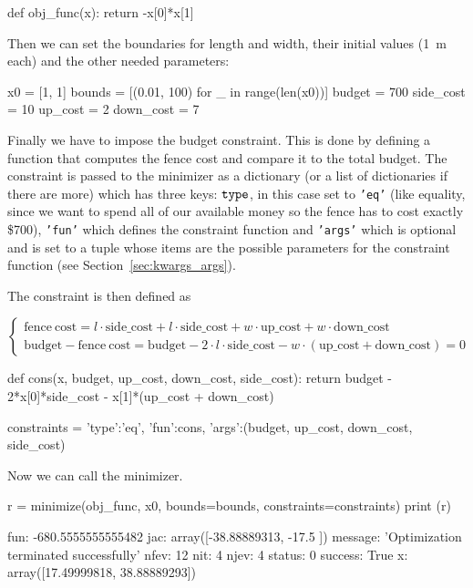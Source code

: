 \begin{ipython}
def obj_func(x):
    return -x[0]*x[1]
\end{ipython}
Then we can set the boundaries for length and width, their initial values (1~m each) and the other needed parameters:

\begin{ipython}
x0 = [1, 1]
bounds = [(0.01, 100) for _ in range(len(x0))]
budget = 700
side_cost = 10
up_cost = 2
down_cost = 7
\end{ipython}

Finally we have to impose the budget constraint. This is done by defining a function that computes the fence cost and compare it to the total budget. 
The constraint is passed to the minimizer as a dictionary (or a list  of dictionaries if there are more) which has three keys: \(\tt{type}\), in this case set to \texttt{'eq'} (like equality, since we want to spend all of our available money so the fence has to cost exactly \$700), \texttt{'fun'} which defines the constraint function and \texttt{'args'} which is optional and is set to a tuple whose items are the possible parameters for the constraint function (see Section~\ref{sec:kwargs_args}).

The constraint is then defined as

\begin{equation*}
\begin{cases}
\mathrm{fence~cost} = l\cdot\mathrm{side\_cost} + l\cdot\mathrm{side\_cost} + w\cdot\mathrm{up\_cost} + w\cdot\mathrm{down\_cost}\\
\mathrm{budget} - \mathrm{fence~cost} = \mathrm{budget} - 2\cdot l\cdot\mathrm{side\_cost} - w\cdot(\mathrm{up\_cost} + \mathrm{down\_cost}) = 0
\end{cases}
\end{equation*}

\begin{ipython}
def cons(x, budget, up_cost, down_cost, side_cost):
    return budget - 2*x[0]*side_cost - x[1]*(up_cost + down_cost)

constraints = {'type':'eq', 'fun':cons,
               'args':(budget, up_cost, down_cost, side_cost)}
\end{ipython}

Now we can call the minimizer.

\begin{ipython}
r = minimize(obj_func, x0, bounds=bounds, constraints=constraints)
print (r)
\end{ipython}
\begin{ioutput}
    fun: -680.5555555555482
    jac: array([-38.88889313, -17.5       ])
message: 'Optimization terminated successfully'
   nfev: 12
    nit: 4  
   njev: 4
 status: 0
success: True
      x: array([17.49999818, 38.88889293])
\end{ioutput}

